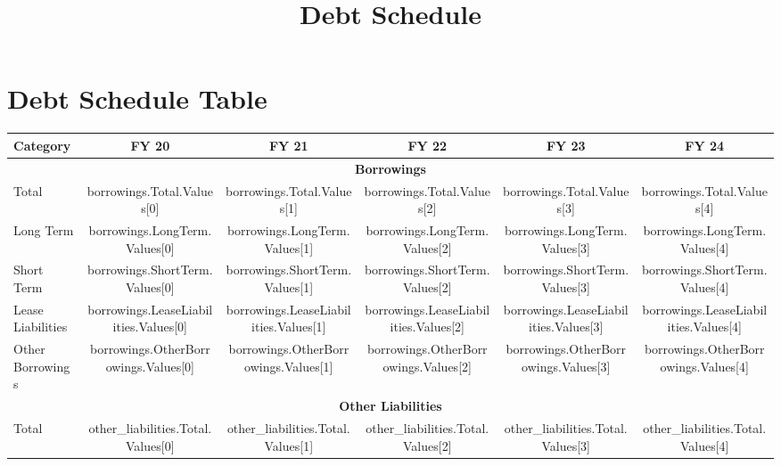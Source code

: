 \documentclass{article}
\begin{document}
\title{\textbf{Debt Schedule}}
\date{}
\maketitle

\section*{Debt Schedule Table}

\begin{tabularx}{\textwidth}{|X|c|c|c|c|c|}
    \hline
    \rowcolor{blue!20}
    \textbf{Category} & \textbf{FY 20} & \textbf{FY 21} & \textbf{FY 22} & \textbf{FY 23} & \textbf{FY 24} \\
    \hline
    \multicolumn{6}{|c|}{\textbf{Borrowings}} \\
    \hline
    Total & {{ borrowings.Total.Values[0] }} & {{ borrowings.Total.Values[1] }} & {{ borrowings.Total.Values[2] }} & {{ borrowings.Total.Values[3] }} & {{ borrowings.Total.Values[4] }} \\
    \hline
    Long Term & {{ borrowings.LongTerm.Values[0] }} & {{ borrowings.LongTerm.Values[1] }} & {{ borrowings.LongTerm.Values[2] }} & {{ borrowings.LongTerm.Values[3] }} & {{ borrowings.LongTerm.Values[4] }} \\
    \hline
    Short Term & {{ borrowings.ShortTerm.Values[0] }} & {{ borrowings.ShortTerm.Values[1] }} & {{ borrowings.ShortTerm.Values[2] }} & {{ borrowings.ShortTerm.Values[3] }} & {{ borrowings.ShortTerm.Values[4] }} \\
    \hline
    Lease Liabilities & {{ borrowings.LeaseLiabilities.Values[0] }} & {{ borrowings.LeaseLiabilities.Values[1] }} & {{ borrowings.LeaseLiabilities.Values[2] }} & {{ borrowings.LeaseLiabilities.Values[3] }} & {{ borrowings.LeaseLiabilities.Values[4] }} \\
    \hline
    Other Borrowings & {{ borrowings.OtherBorrowings.Values[0] }} & {{ borrowings.OtherBorrowings.Values[1] }} & {{ borrowings.OtherBorrowings.Values[2] }} & {{ borrowings.OtherBorrowings.Values[3] }} & {{ borrowings.OtherBorrowings.Values[4] }} \\
    \hline
    \multicolumn{6}{|c|}{\textbf{Other Liabilities}} \\
    \hline
    Total & {{ other_liabilities.Total.Values[0] }} & {{ other_liabilities.Total.Values[1] }} & {{ other_liabilities.Total.Values[2] }} & {{ other_liabilities.Total.Values[3] }} & {{ other_liabilities.Total.Values[4] }} \\
    \hline

\end{tabularx}
\end{document}
